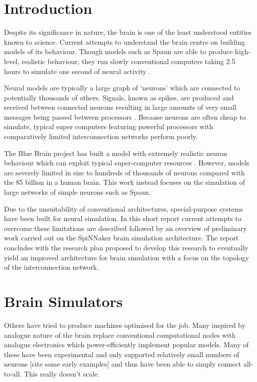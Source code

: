 \section{Introduction}
	
	Despite its significance in nature, the brain is one of the least understood
	entities known to science. Current attempts to understand the brain centre on
	building models of its behaviour. Though models such as Spaun are able to
	produce high-level, realistic behaviour, they run slowly conventional
	computers taking 2.5 hours to simulate one second of neural activity
	\cite{eliasmith12}.
	
	Neural models are typically a large graph of `neurons' which are connected to
	potentially thousands of others. Signals, known as spikes, are produced and
	received between connected neurons resulting in large amounts of very small
	messages being passed between processors \cite{vainbrand11}. Because neurons
	are often cheap to simulate, typical super computers featuring powerful
	processors with comparatively limited interconnection networks perform poorly.
	
	The Blue Brain project has built a model with extremely realistic neuron
	behaviour which can exploit typical super-computer resources \cite{markram06}.
	However, models are severely limited in size to hundreds of thousands of
	neurons compared with the 85 billion in a human brain. This work instead
	focuses on the simulation of large networks of simple neurons such as Spaun.
	
	Due to the unsuitability of conventional architectures, special-purpose
	systems have been built for neural simulation. In this short report current
	attempts to overcome these limitations are described followed by an overview
	of preliminary work carried out on the SpiNNaker brain simulation
	architecture. The report concludes with the research plan proposed to develop
	this research to eventually yield an improved architecture for brain
	simulation with a focus on the topology of the interconnection network.

\section{Brain Simulators}

Others have tried to produce machines optimised for the job. Many inspired by
analogue nature of the brain replace conventional computational nodes with
analogue electronics which power-efficiently implement popular models. Many of
these have been experimental and only supported relatively small numbers of
neurons [cite some early examples] and thus have been able to simply connect
all-to-all. This really doesn't scale.

